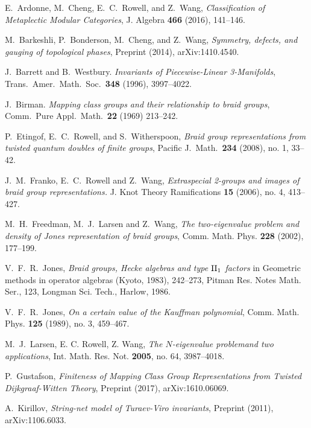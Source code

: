 \documentclass[12pt]{article}
\theoremstyle{plain} \numberwithin{equation}{section}
\theoremstyle{definition}
\begin{document}
\begin{thebibliography}{0}
   E.\ Ardonne, M.\ Cheng, E.\ C.\ Rowell, and Z.\ Wang, \emph{Classification of Metaplectic Modular Categories}, J. Algebra \textbf{466} (2016), 141--146.

   M.\ Barkeshli, P.\ Bonderson, M.\ Cheng, and Z.\ Wang, \emph{Symmetry, defects, and gauging of topological phases}, Preprint (2014), arXiv:1410.4540.
  
   J.\ Barrett and B.\ Westbury. {\em Invariants
of Piecewise-Linear 3-Manifolds}, Trans.\ Amer.\ Math.\ Soc.\ \textbf{348} (1996), 3997--4022.

   J.\ Birman. \emph{Mapping class groups and their relationship to braid groups}, Comm.\ Pure Appl.\ Math.\ \textbf{22} (1969) 213--242.

   P.\ Etingof, E.\ C.\ Rowell, and S.\ Witherspoon, \emph{Braid group representations from twisted quantum doubles of finite groups}, Pacific J.\ Math.\ \textbf{234} (2008), no. 1, 33--42.


     J.\ M.\ Franko, E.\ C.\ Rowell and Z.\ Wang, \emph{Extraspecial 2-groups and images of braid group representations.}  J. Knot Theory Ramifications \textbf{15} (2006),  no. 4, 413--427.

          M.\ H.\ Freedman, M.\ J.\ Larsen and Z.\ Wang, \emph{The two-eigenvalue problem and density of Jones representation of braid groups}, Comm. Math. Phys. \textbf{228} (2002), 177--199.


 V.\ F.\ R.\ Jones, \emph{Braid groups, Hecke algebras and type ${\rm II}\sb 1$ factors} in Geometric methods in operator algebras (Kyoto, 1983), 242--273, Pitman Res. Notes Math. Ser., 123, Longman Sci. Tech., Harlow, 1986.

 V.\ F.\ R.\ Jones, \textit{On a certain value of the Kauffman polynomial}, Comm. Math. Phys. \textbf{125} (1989), no. 3, 459--467.

 M.\ J.\ Larsen, E. C. Rowell, Z. Wang, \emph{The $N$-eigenvalue problemand two applications}, Int. Math. Res. Not.  \textbf{2005},  no. 64, 3987--4018.

  
   P.\ Gustafson, \emph{Finiteness of Mapping Class Group Representations from Twisted Dijkgraaf-Witten Theory}, Preprint (2017), arXiv:1610.06069.

   A.\ Kirillov, \emph{String-net model of {Turaev-Viro} invariants}, Preprint (2011), arXiv:1106.6033.


\end{thebibliography}
\end{document}
